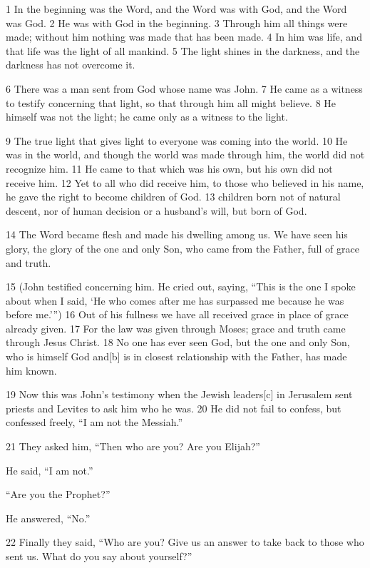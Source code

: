 \begin{englishabstract}

1 In the beginning was the Word, and the Word was with God, and the Word was God. 2 He was with God in the beginning. 3 Through him all things were made; without him nothing was made that has been made. 4 In him was life, and that life was the light of all mankind. 5 The light shines in the darkness, and the darkness has not overcome it.

6 There was a man sent from God whose name was John. 7 He came as a witness to testify concerning that light, so that through him all might believe. 8 He himself was not the light; he came only as a witness to the light.

9 The true light that gives light to everyone was coming into the world. 10 He was in the world, and though the world was made through him, the world did not recognize him. 11 He came to that which was his own, but his own did not receive him. 12 Yet to all who did receive him, to those who believed in his name, he gave the right to become children of God. 13 children born not of natural descent, nor of human decision or a husband’s will, but born of God.

14 The Word became flesh and made his dwelling among us. We have seen his glory, the glory of the one and only Son, who came from the Father, full of grace and truth.

15 (John testified concerning him. He cried out, saying, “This is the one I spoke about when I said, ‘He who comes after me has surpassed me because he was before me.’”) 16 Out of his fullness we have all received grace in place of grace already given. 17 For the law was given through Moses; grace and truth came through Jesus Christ. 18 No one has ever seen God, but the one and only Son, who is himself God and[b] is in closest relationship with the Father, has made him known.

19 Now this was John’s testimony when the Jewish leaders[c] in Jerusalem sent priests and Levites to ask him who he was. 20 He did not fail to confess, but confessed freely, “I am not the Messiah.”

21 They asked him, “Then who are you? Are you Elijah?”

He said, “I am not.”

“Are you the Prophet?”

He answered, “No.”

22 Finally they said, “Who are you? Give us an answer to take back to those who sent us. What do you say about yourself?”


\end{englishabstract}
